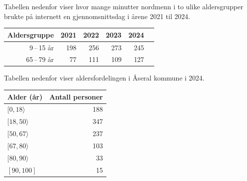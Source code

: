 Tabellen nedenfor viser hvor mange minutter nordmenn i to ulike aldersgrupper brukte
på internett en gjennomsnittsdag i årene 2021 til 2024.
\begin{center}
	\small
	\centering
	\begin{tabular}{|r|r|r|r|r|r|}
		\hline
		\rowcolor{Gray!20} Aldersgruppe & 2021 & 2022 & 2023 & 2024 \\ \hline
		9\,--\,15 år & 198 & 256 & 273 & 245 \\ \hline
		65\,--\,79 år & 77  & 111 & 109 & 127 \\ \hline
	\end{tabular}
\end{center}

Tabellen nedenfor viser aldersfordelingen i Åseral kommune i 2024.

\begin{table}[h]
	\centering
	\begin{tabular}{|l|r|}
		\hline
		Alder (år) & Antall personer \\ \hline
		$[0, 18\rangle$    & 188 \\ \hline
		$[18, 50\rangle$   & 347 \\ \hline
		$[50, 67\rangle$   & 237 \\ \hline
		$[67, 80\rangle$   & 103 \\ \hline
		$[80, 90\rangle$   & 33  \\ \hline
		$[90, 100]$  & 15  \\ \hline
	\end{tabular}
\end{table}

